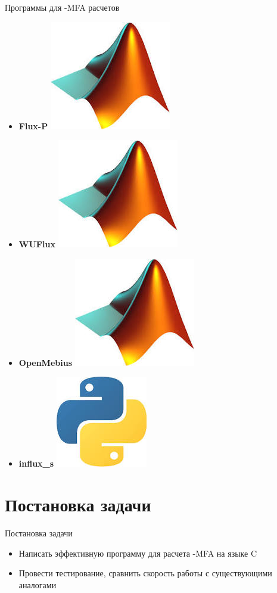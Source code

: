 \documentclass[aspectratio=169]{beamer}
\newcommand{\CC}{C\nolinebreak\hspace{-.05em}\raisebox{.4ex}{\tiny\bf +}\nolinebreak\hspace{-.10em}\raisebox{.4ex}{\tiny\bf +}}
\def\CC{{C\nolinebreak[4]\hspace{-.05em}\raisebox{.4ex}{\tiny\bf ++}}} %
\begin{document}
\begin{frame}{Программы для -MFA расчетов}
\begin{itemize}
		\item \textbf{Flux-P} \includegraphics[height=\fontcharht\font`\B]{matlab.jpeg}
		\item \textbf{WUFlux} \includegraphics[height=\fontcharht\font`\B]{matlab.jpeg}
		\item \textbf{OpenMebius} \includegraphics[height=\fontcharht\font`\B]{matlab.jpeg}
		\item \textbf{influx\_s} \includegraphics[height=\fontcharht\font`\B]{python.jpeg}
	\end{itemize}
\end{frame}

\section{Постановка задачи}
\begin{frame}{Постановка задачи}
	\begin{itemize}
		\item Написать эффективную программу для расчета -MFA на языке \CC{}
		\item Провести тестирование, сравнить скорость работы с существующими аналогами
	\end{itemize}
\end{frame}
\end{document}
